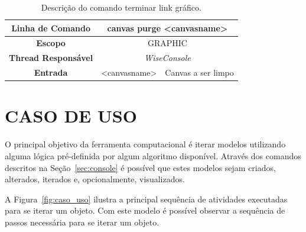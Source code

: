 \begin{center}
	\begin{table}[!htbp]
		\begin{tabularx}{\textwidth}{c|c|X}
			\toprule
			\textbf{Linha de Comando} & \multicolumn{2}{c}{canvas purge <canvas\underline{\space\space}name>} \\
			\midrule
			\textbf{Escopo} & \multicolumn{2}{c}{GRAPHIC} \\
			\hline
			\textbf{Thread Responsável} & \multicolumn{2}{c}{\textit{WiseConsole}} \\
			\hline
			\textbf{Entrada} & <canvas\underline{\space\space}name> & Canvas a ser limpo \\
			\bottomrule
		\end{tabularx}
		\caption{Descrição do comando terminar link gráfico.}
		\label{tab:graphic_purge}
	\end{table}
\end{center}

\section{CASO DE USO}\label{sec:caso_de_uso}

O principal objetivo da ferramenta computacional é iterar modelos utilizando alguma lógica pré-definida por algum algoritmo disponível. Através dos comandos descritos na Seção~\ref{sec:console} é possível que estes modelos sejam criados, alterados, iterados e, opcionalmente, visualizados.

 A Figura~\ref{fig:caso_uso} ilustra a principal sequência de atividades executadas para se iterar um objeto. Com este modelo é possível observar a sequência de passos necessária para se iterar um objeto.

